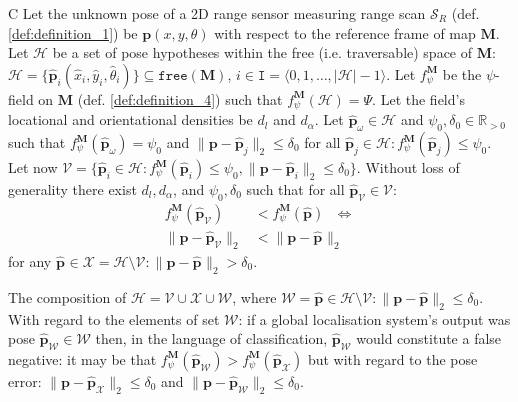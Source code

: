 \begin{customcnj}{C}
  \label{cnj:conjecture_c}
  Let the unknown pose of a 2D range sensor measuring range scan $\mathcal{S}_R$
  (def. \ref{def:definition_1}) be $\bm{p}(x,y,\theta)$ with respect to the
  reference frame of map $\bm{M}$.
  Let $\mathcal{H}$ be a set of pose hypotheses within the free (i.e.
  traversable) space of $\bm{M}$:
  $\mathcal{H} = \{\hat{\bm{p}}_i(\hat{x}_i,\hat{y}_i,\hat{\theta}_i)\} \subseteq \texttt{free}(\bm{M})$,
  $i \in \texttt{I} = \langle 0,1,\dots,|\mathcal{H}|-1\rangle$.
  Let $f_{\psi}^{\bm{M}}$ be the $\psi$-field on $\bm{M}$
  (def. \ref{def:definition_4}) such that $f_{\psi}^{\bm{M}}(\mathcal{H})= \Psi$.
  Let the field's locational and orientational densities be
  $d_{l}$ and $d_{\alpha}$.
  Let $\hat{\bm{p}}_\omega \in \mathcal{H}$ and $\psi_0,\delta_0 \in \mathbb{R}_{>0}$
  such that $f_{\psi}^{\bm{M}}(\hat{\bm{p}}_\omega ) = \psi_0$ and
  $\|\bm{p}-\hat{\bm{p}}_j\|_2 \leq \delta_0$ for all
  $\hat{\bm{p}}_j \in \mathcal{H}: f_{\psi}^{\bm{M}}(\hat{\bm{p}}_j) \leq \psi_0$.
  Let now $\mathcal{V} = \{\hat{\bm{p}}_i \in \mathcal{H}: f_{\psi}^{\bm{M}}(\hat{\bm{p}}_i) \leq \psi_0,
  \|\bm{p}-\hat{\bm{p}}_i\|_2 \leq \delta_0\}$.
  Without loss of generality there exist $d_{l}, d_{\alpha}$, and
  $\psi_0,\delta_0$ such that for all
  $\hat{\bm{p}}_\mathcal{V} \in \mathcal{V}$:
  \begin{align}
    f_{\psi}^{\bm{M}}(\hat{\bm{p}}_\mathcal{V}) &< f_{\psi}^{\bm{M}}(\hat{\bm{p}}) \ \ \ \Leftrightarrow \nonumber \\
    \|\bm{p}-\hat{\bm{p}}_\mathcal{V}\|_2 &< \|\bm{p}-\hat{\bm{p}}_{}\|_2 \nonumber
  \end{align}
  for any $\hat{\bm{p}}_{} \in \mathcal{X} = \mathcal{H} \setminus  \mathcal{V}: \|\bm{p}-\hat{\bm{p}}_{}\|_2 > \delta_0$.
\end{customcnj}

\begin{remark}
  \label{rem:remark_1}
  The composition of
  $\mathcal{H} = \mathcal{V} \cup \mathcal{X} \cup \mathcal{W}$, where
  $\mathcal{W} = \hat{\bm{p}} \in {\mathcal{H} \setminus \mathcal{V}}: \|\bm{p}-\hat{\bm{p}}\|_2 \leq \delta_0$.
  With regard to the elements of set $\mathcal{W}$: if a global localisation
  system's output was pose
  $\hat{\bm{p}}_{\mathcal{W}} \in \mathcal{W}$ then, in the language of
  classification, $\hat{\bm{p}}_{\mathcal{W}}$ would constitute a false
  negative: it may be that
  $f_{\psi}^{\bm{M}}(\hat{\bm{p}}_{\mathcal{W}}) > f_{\psi}^{\bm{M}}(\hat{\bm{p}}_{\mathcal{X}})$
  but with regard to the pose error:
  $\|\bm{p}-\hat{\bm{p}}_{\mathcal{X}}\|_2 \leq \delta_0$ and
  $\|\bm{p}-\hat{\bm{p}}_{\mathcal{W}}\|_2 \leq \delta_0$.
\end{remark}

